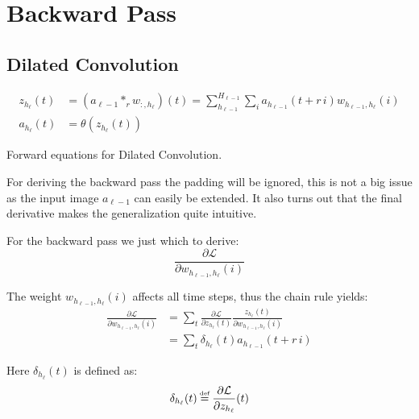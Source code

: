 \chapter{Backward Pass}

\section{Dilated Convolution}
\label{appendix:backward-pass:dilated-convolution}

\begin{equationbox}[H]
\begin{equation*}
\begin{aligned}
z_{h_\ell}(t) &= (a_{\ell-1} *_r w_{:, h_\ell})(t) = \sum_{h_{\ell-1}}^{H_{\ell-1}} \sum_{i} a_{h_{\ell-1}}(t + r\,i) w_{h_{\ell-1}, h_\ell}(i) \\
a_{h_\ell}(t) &= \theta(z_{h_\ell}(t))
\end{aligned}
\end{equation*}
\caption{Forward equations for Dilated Convolution.}
\end{equationbox}

For deriving the backward pass the padding will be ignored, this is not a big issue as the input image $a_{\ell-1}$ can easily be extended. It also turns out that the final derivative makes the generalization quite intuitive.

For the backward pass we just which to derive:
\begin{equation}
\frac{\partial \mathcal{L}}{\partial w_{h_{\ell-1},h_\ell}(i)}
\end{equation}

The weight $w_{h_{\ell-1},h_\ell}(i)$ affects all time steps, thus the chain rule yields:
\begin{equation}
\begin{aligned}
\frac{\partial \mathcal{L}}{\partial w_{h_{\ell-1},h_\ell}(i)} &= \sum_{t} \frac{\partial \mathcal{L}}{\partial z_{h_\ell}(t)} \frac{z_{h_\ell}(t)}{\partial w_{h_{\ell-1},h_\ell}(i)} \\
&= \sum_{t} \delta_{h_\ell}(t) a_{h_{\ell-1}}(t + r\,i)
\end{aligned}
\end{equation}

Here $\delta_{h_\ell}(t)$ is defined as:
\begin{equation}
\delta_{h_\ell}(t) \defeq \frac{\partial \mathcal{L}}{\partial z_{h_\ell}}(t)
\end{equation}

